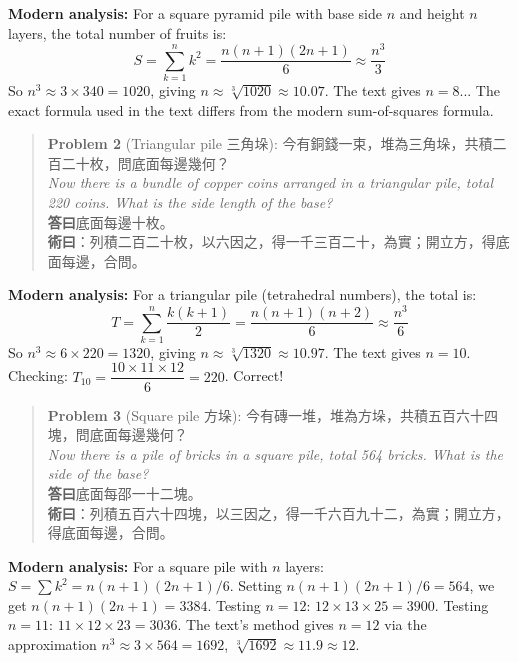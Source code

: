 \documentclass[11pt,a4paper]{article}
\newenvironment{vol3problembox}{%
  \begin{quote}
  \itshape
  \color{vol3color}
}{%
  \end{quote}
}
\begin{document}
\textbf{Modern analysis:} For a square pyramid pile with base side $n$ and height $n$ layers, the total number of fruits is:
$$S = \sum_{k=1}^{n} k^2 = \frac{n(n+1)(2n+1)}{6} \approx \frac{n^3}{3}$$
So $n^3 \approx 3 \times 340 = 1020$, giving $n \approx \sqrt[3]{1020} \approx 10.07$. The text gives $n = 8$... The exact formula used in the text differs from the modern sum-of-squares formula.

\vspace{0.3cm}

\begin{vol3problembox}
\textbf{Problem 2} (Triangular pile 三角垛): 今有銅錢一束，堆為三角垛，共積二百二十枚，問底面每邊幾何？\\[0.2cm]
\textit{Now there is a bundle of copper coins arranged in a triangular pile, total 220 coins. What is the side length of the base?}\\[0.2cm]
\textbf{答曰}底面每邊十枚。\\[0.2cm]
\textbf{術曰}：列積二百二十枚，以六因之，得一千三百二十，為實；開立方，得底面每邊，合問。
\end{vol3problembox}

\textbf{Modern analysis:} For a triangular pile (tetrahedral numbers), the total is:
$$T = \sum_{k=1}^{n} \frac{k(k+1)}{2} = \frac{n(n+1)(n+2)}{6} \approx \frac{n^3}{6}$$
So $n^3 \approx 6 \times 220 = 1320$, giving $n \approx \sqrt[3]{1320} \approx 10.97$. The text gives $n = 10$. Checking: $T_{10} = \dfrac{10 \times 11 \times 12}{6} = 220$. Correct!

\vspace{0.3cm}

\begin{vol3problembox}
\textbf{Problem 3} (Square pile 方垛): 今有磚一堆，堆為方垛，共積五百六十四塊，問底面每邊幾何？\\[0.2cm]
\textit{Now there is a pile of bricks in a square pile, total 564 bricks. What is the side of the base?}\\[0.2cm]
\textbf{答曰}底面每邵一十二塊。\\[0.2cm]
\textbf{術曰}：列積五百六十四塊，以三因之，得一千六百九十二，為實；開立方，得底面每邊，合問。
\end{vol3problembox}

\textbf{Modern analysis:} For a square pile with $n$ layers: $S = \sum k^2 = n(n+1)(2n+1)/6$. Setting $n(n+1)(2n+1)/6 = 564$, we get $n(n+1)(2n+1) = 3384$. Testing $n = 12$: $12 \times 13 \times 25 = 3900$. Testing $n = 11$: $11 \times 12 \times 23 = 3036$. The text's method gives $n = 12$ via the approximation $n^3 \approx 3 \times 564 = 1692$, $\sqrt[3]{1692} \approx 11.9 \approx 12$.
\end{document}
